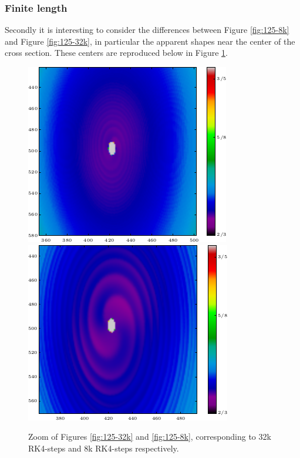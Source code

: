 \documentclass[a4paper]{article}
\begin{document}
\subsubsection{Finite length}
Secondly it is interesting to consider the differences between Figure \ref{fig:125-8k} and Figure \ref{fig:125-32k}, in particular the apparent shapes near the center of the cross section. These centers are reproduced below in Figure \ref{fig:artefacts}.
\begin{figure}[!ht]
	\centering
{}
  \includegraphics[width=\linewidth]{Figures/artefact32k.png}
\endminipage ~
  \includegraphics[width=\linewidth]{Figures/artefact8k.png}
\endminipage\hfill
	\caption{Zoom of Figures \ref{fig:125-32k} and \ref{fig:125-8k}, corresponding to 32k RK4-steps and 8k RK4-steps respectively.}\label{fig:artefacts}
\end{figure}
\end{document}
